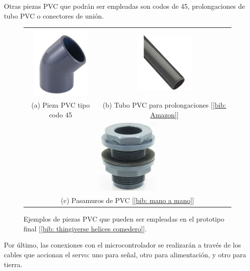 \documentclass[12pt]{article}
\begin{document}
	\noindent Otras piezas PVC que podrán ser empleadas son codos de 45\degree, prolongaciones de tubo PVC o conectores de unión.\\
	
	\begin{figure}[h]
		\begin{center}
			\begin{tabular}{cc}
				\includegraphics[width=30mm]{img/pieza_pvc_codo45.png} &   \includegraphics[width=30mm]{img/tubo_pvc.jpg} \\
				(a) Pieza PVC tipo codo 45\degree [\ref{bib: Poolaria}] & (b) Tubo PVC para prolongaciones [\ref{bib: Amazon}]\\[6pt]
				\multicolumn{2}{c}{\includegraphics[width=30mm]{img/pasamuro_pvc.png} }\\
				\multicolumn{2}{c}{(c) Pasamuros de PVC [\ref{bib: mano a mano}]}
			\end{tabular}
			\caption{Ejemplos de piezas PVC que pueden ser empleadas en el prototipo final [\ref{bib: thingiverse helices comedero}].}
			\label{fig: piezas PVC posibles.}
		\end{center}
	\end{figure}
	
	\pagebreak
	
	\noindent Por último, las conexiones con el microcontrolador se realizarán a través de los cables que accionan el servo: uno para señal, otro para alimentación, y otro para tierra. \\
	
\end{document}
